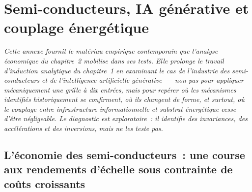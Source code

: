 
\chapter{Semi-conducteurs, IA générative et couplage énergétique}\label{ch:annexe-genai}

\noindent\emph{Cette annexe fournit le matériau empirique contemporain que l'analyse économique du chapitre~2 mobilise dans ses tests. Elle prolonge le travail d'induction analytique du chapitre~1 en examinant le cas de l'industrie des semi-conducteurs et de l'intelligence artificielle générative~--- non pas pour appliquer mécaniquement une grille à dix entrées, mais pour repérer où les mécanismes identifiés historiquement se confirment, où ils changent de forme, et surtout, où le couplage entre infrastructure informationnelle et substrat énergétique cesse d'être négligeable. Le diagnostic est exploratoire~: il identifie des invariances, des accélérations et des inversions, mais ne les teste pas.}

\bigskip

\section{L'économie des semi-conducteurs~: une course aux rendements d'échelle sous contrainte de coûts croissants}


